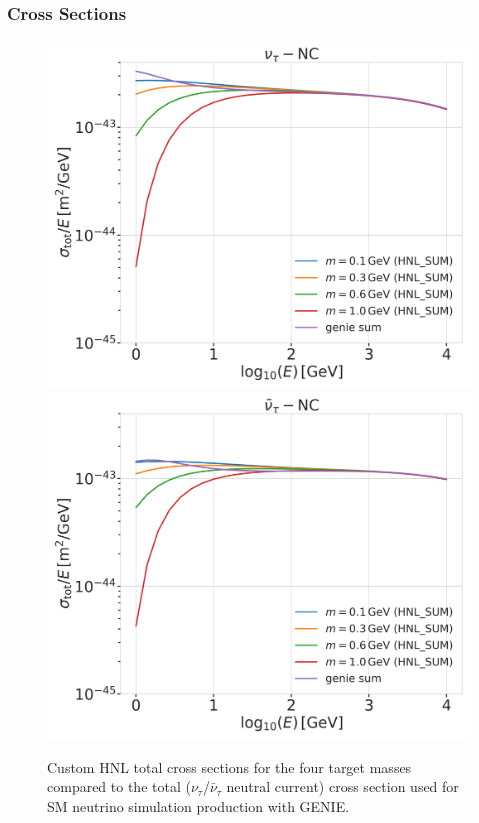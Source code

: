 \subsubsection{Cross Sections} 



\begin{figure}
    \includegraphics[width=.49\linewidth]{figures/hnl_simulation/cross_sections/custom_HNL_xsecs_final_SUM_flavorwise_total_xsecs_sigma-nutau-N-nc.png}
    \includegraphics[width=.49\linewidth]{figures/hnl_simulation/cross_sections/custom_HNL_xsecs_final_SUM_flavorwise_total_xsecs_sigma-nutaubar-N-nc.png}
    \caption{Custom HNL total cross sections for the four target masses compared to the total ($\nu_\tau$/$\bar{\nu}_\tau$ neutral current) cross section used for SM neutrino simulation production with GENIE.}
\end{figure}

